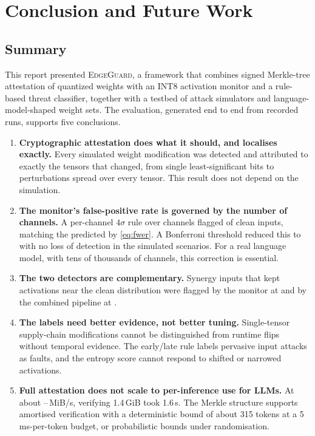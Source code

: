 \chapter{Conclusion and Future Work}
\label{ch:conclusion}

\section{Summary}

This report presented \textsc{EdgeGuard}, a framework that combines signed Merkle-tree
attestation of quantized weights with an INT8 activation monitor and a rule-based threat
classifier, together with a testbed of attack simulators and language-model-shaped weight sets.
The evaluation, generated end to end from recorded runs, supports five conclusions.

\begin{enumerate}[leftmargin=*]
  \item \textbf{Cryptographic attestation does what it should, and localises exactly.} Every
        simulated weight modification was detected and attributed to exactly the tensors that
        changed, from single least-significant bits to perturbations spread over every tensor.
        This result does not depend on the simulation.
  \item \textbf{The monitor's false-positive rate is governed by the number of channels.} A
        per-channel $4\sigma$ rule over \MChannels{} channels flagged \EmpFPRZFour{} of clean
        inputs, matching the \PredFPRZFour{} predicted by \cref{eq:fwer}. A Bonferroni threshold
        reduced this to \EmpFPRBonf{} with no loss of detection in the simulated scenarios. For a
        real language model, with tens of thousands of channels, this correction is essential.
  \item \textbf{The two detectors are complementary.} Synergy inputs that kept activations near
        the clean distribution were flagged by the monitor at \MonSynergy{} and by the combined
        pipeline at \FlagSynergy{}.
  \item \textbf{The labels need better evidence, not better tuning.} Single-tensor supply-chain
        modifications cannot be distinguished from runtime flips without temporal evidence. The
        early/late rule labels pervasive input attacks as faults, and the entropy score cannot
        respond to shifted or narrowed activations.
  \item \textbf{Full attestation does not scale to per-inference use for LLMs.} At about
        \MerkThrMin{}--\MerkThrMax{}\,MiB/s, verifying 1.4\,GiB took 1.6\,s. The Merkle structure supports
        amortised verification with a deterministic bound of about 315 tokens at a 5\,ms-per-token
        budget, or probabilistic bounds under randomisation.
\end{enumerate}

